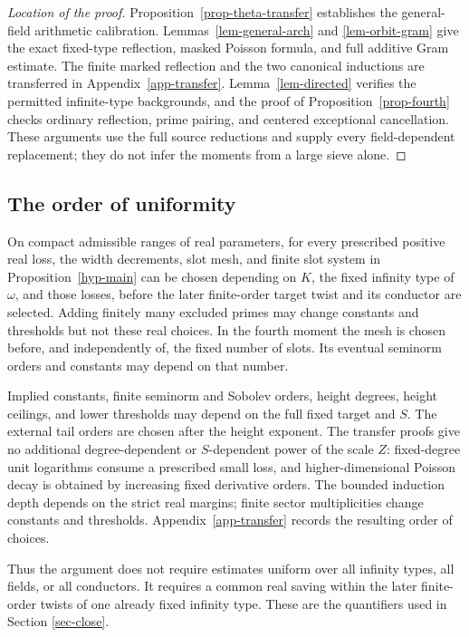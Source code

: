 \documentclass[11pt,a4paper]{article}
\theoremstyle{remark}\newtheorem{remark}[theorem]{Remark}
\numberwithin{equation}{section}
\begin{document}
\begin{proof}[Location of the proof]
Proposition~\ref{prop-theta-transfer} establishes the general-field
arithmetic calibration. Lemmas~\ref{lem-general-arch} and
\ref{lem-orbit-gram} give the exact fixed-type reflection, masked
Poisson formula, and full additive Gram estimate. The finite marked
reflection and the two canonical inductions are transferred in
Appendix~\ref{app-transfer}. Lemma~\ref{lem-directed} verifies the
permitted infinite-type backgrounds, and the proof of
Proposition~\ref{prop-fourth} checks ordinary reflection, prime
pairing, and centered exceptional cancellation. These arguments use
the full source reductions and supply every field-dependent
replacement; they do not infer the moments from a large sieve alone.
\end{proof}

\subsection{The order of uniformity}

On compact admissible ranges of real parameters, for every prescribed
positive real loss, the width decrements, slot mesh, and finite slot
system in Proposition~\ref{hyp-main} can be chosen depending on $K$, the fixed
infinity type of $\omega$, and those losses, before the later
finite-order target twist and its conductor are selected.
Adding finitely many excluded primes may change constants and
thresholds but not these real choices.
In the fourth moment the mesh is chosen before, and independently
of, the fixed number of slots. Its eventual seminorm orders and
constants may depend on that number.

Implied constants, finite seminorm and Sobolev orders, height degrees,
height ceilings, and lower thresholds may depend on the full fixed
target and $S$. The external tail orders are chosen after the
height exponent. The transfer proofs give no additional
degree-dependent or $S$-dependent power of the scale $Z$:
fixed-degree unit logarithms consume a prescribed small loss,
and higher-dimensional Poisson decay is obtained by increasing
fixed derivative orders. The bounded induction depth depends
on the strict real margins; finite sector multiplicities change
constants and thresholds. Appendix~\ref{app-transfer} records
the resulting order of choices.

Thus the argument does not require estimates uniform over all
infinity types, all fields, or all conductors. It requires a common
real saving within the later finite-order twists of one already
fixed infinity type. These are the quantifiers used in
Section \ref{sec-close}.
\end{document}
